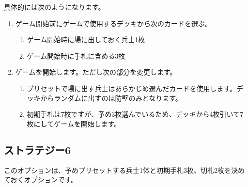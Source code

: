 \documentclass[letterpaper,10pt,dvipdfmx]{sphinxmanual}
\begin{document}
\sphinxAtStartPar
具体的には次のようになります。
\begin{enumerate}
%
\item {} 
\sphinxAtStartPar
ゲーム開始前にゲームで使用するデッキから次のカードを選ぶ。
\begin{enumerate}
%
\item {} 
\sphinxAtStartPar
ゲーム開始時に場に出しておく兵士1枚

\item {} 
\sphinxAtStartPar
ゲーム開始時に手札に含める3枚

\end{enumerate}

\item {} 
\sphinxAtStartPar
ゲームを開始します。ただし次の部分を変更します。
\begin{enumerate}
%
\item {} 
\sphinxAtStartPar
プリセットで場に出す兵士はあらかじめ選んだカードを使用します。デッキからランダムに出すのは防壁のみとなります。

\item {} 
\sphinxAtStartPar
初期手札は7枚ですが、予め3枚選んでいるため、デッキから4枚引いて7枚にしてゲームを開始します。

\end{enumerate}

\end{enumerate}


\subsection{ストラテジー6}
\label{\detokenize{match-regulations/match-regulations:id13}}
\sphinxAtStartPar
このオプションは、予めプリセットする兵士1体と初期手札3枚、切札2枚を決めておくオプションです。
\end{document}
